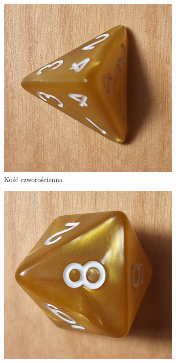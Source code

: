 \begin{figure}[h]
    \centering
      \begin{subfigure}{.3\textwidth}
        \includegraphics[width=.9\linewidth, angle=-90, clip]{chapters/01-wstep/figures/k4}
        \caption{\label{fig:k4}Kość czworościenna}
      \end{subfigure}%
      \begin{subfigure}{.3\textwidth}
        \includegraphics[width=.9\linewidth, angle=-90, clip]{chapters/01-wstep/figures/k8}

\end{subfigure}
\end{figure}
